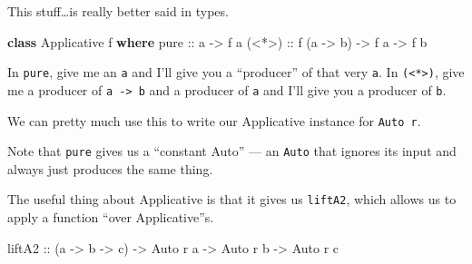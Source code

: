 \documentclass[]{article}
\newenvironment{Shaded}{}{}
\newcommand{\CommentTok}[1]{\textcolor[rgb]{0.38,0.63,0.69}{\textit{#1}}}
\newcommand{\DataTypeTok}[1]{\textcolor[rgb]{0.56,0.13,0.00}{#1}}
\newcommand{\FunctionTok}[1]{\textcolor[rgb]{0.02,0.16,0.49}{#1}}
\newcommand{\KeywordTok}[1]{\textcolor[rgb]{0.00,0.44,0.13}{\textbf{#1}}}
\newcommand{\NormalTok}[1]{#1}
\newcommand{\OtherTok}[1]{\textcolor[rgb]{0.00,0.44,0.13}{#1}}
\begin{document}
This stuff\ldots{}is really better said in types.

\begin{Shaded}
\begin{Highlighting}[]
\KeywordTok{class} \DataTypeTok{Applicative}\NormalTok{ f }\KeywordTok{where}
\OtherTok{    pure  ::}\NormalTok{ a }\OtherTok{->}\NormalTok{ f a}
\OtherTok{    (<*>) ::}\NormalTok{ f (a }\OtherTok{->}\NormalTok{ b) }\OtherTok{->}\NormalTok{ f a }\OtherTok{->}\NormalTok{ f b}
\end{Highlighting}
\end{Shaded}

In \texttt{pure}, give me an \texttt{a} and I'll give you a ``producer'' of that
very \texttt{a}. In \texttt{(\textless{}*\textgreater{})}, give me a producer of
\texttt{a\ -\textgreater{}\ b} and a producer of \texttt{a} and I'll give you a
producer of \texttt{b}.

We can pretty much use this to write our Applicative instance for
\texttt{Auto\ r}.

\begin{Shaded}
\end{Shaded}

Note that \texttt{pure} gives us a ``constant Auto'' --- an \texttt{Auto} that
ignores its input and always just produces the same thing.

The useful thing about Applicative is that it gives us \texttt{liftA2}, which
allows us to apply a function ``over Applicative''s.

\begin{Shaded}
\begin{Highlighting}[]
\OtherTok{liftA2 ::}\NormalTok{ (a }\OtherTok{->}\NormalTok{ b }\OtherTok{->}\NormalTok{ c) }\OtherTok{->} \DataTypeTok{Auto}\NormalTok{ r a }\OtherTok{->} \DataTypeTok{Auto}\NormalTok{ r b }\OtherTok{->} \DataTypeTok{Auto}\NormalTok{ r c}
\end{Highlighting}
\end{Shaded}
\end{document}
